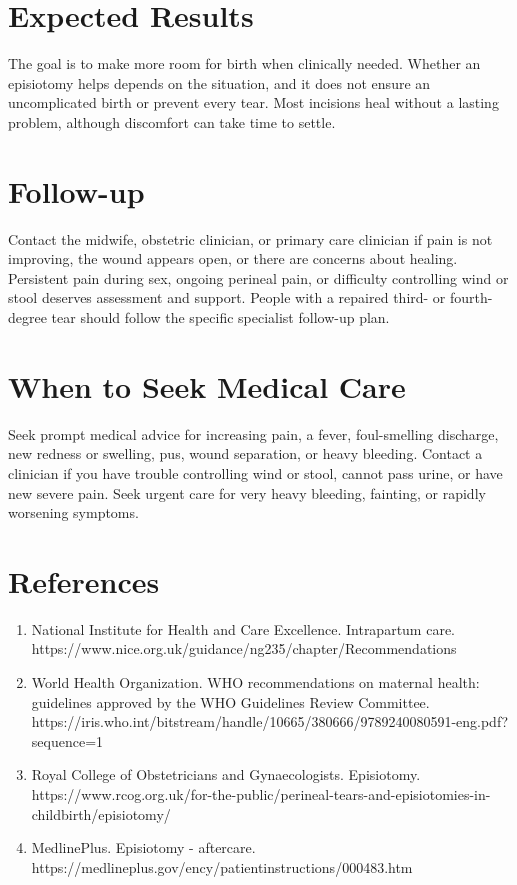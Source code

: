 \section*{Expected Results}
The goal is to make more room for birth when clinically needed. Whether an episiotomy helps depends on the situation, and it does not ensure an uncomplicated birth or prevent every tear. Most incisions heal without a lasting problem, although discomfort can take time to settle.

\section*{Follow-up}
Contact the midwife, obstetric clinician, or primary care clinician if pain is not improving, the wound appears open, or there are concerns about healing. Persistent pain during sex, ongoing perineal pain, or difficulty controlling wind or stool deserves assessment and support. People with a repaired third- or fourth-degree tear should follow the specific specialist follow-up plan.

\section*{When to Seek Medical Care}
Seek prompt medical advice for increasing pain, a fever, foul-smelling discharge, new redness or swelling, pus, wound separation, or heavy bleeding. Contact a clinician if you have trouble controlling wind or stool, cannot pass urine, or have new severe pain. Seek urgent care for very heavy bleeding, fainting, or rapidly worsening symptoms.

\section*{References}
\begin{enumerate}
  \item National Institute for Health and Care Excellence. Intrapartum care. https://www.nice.org.uk/guidance/ng235/chapter/Recommendations
  \item World Health Organization. WHO recommendations on maternal health: guidelines approved by the WHO Guidelines Review Committee. https://iris.who.int/bitstream/handle/10665/380666/9789240080591-eng.pdf?sequence=1
  \item Royal College of Obstetricians and Gynaecologists. Episiotomy. https://www.rcog.org.uk/for-the-public/perineal-tears-and-episiotomies-in-childbirth/episiotomy/
  \item MedlinePlus. Episiotomy - aftercare. https://medlineplus.gov/ency/patientinstructions/000483.htm
\end{enumerate}

\clearpage
